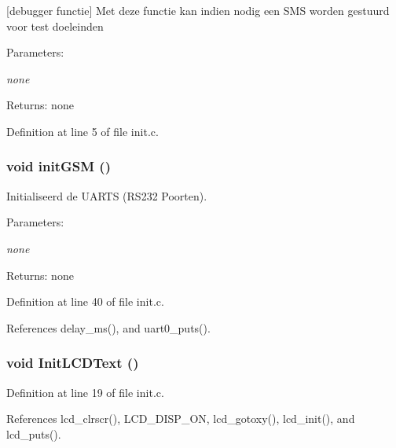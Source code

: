 [debugger functie] Met deze functie kan indien nodig een SMS worden gestuurd voor test doeleinden 

\begin{Desc}
\item[Parameters:]
\begin{description}
\item[{\em none}]\end{description}
\end{Desc}
\begin{Desc}
\item[Returns:]none \end{Desc}


Definition at line 5 of file init.c.
\subsubsection{\setlength{\rightskip}{0pt plus 5cm}void initGSM ()}\label{init_8h_4e89a007463e590994ce3fe3dc12df1d}


Initialiseerd de UARTS (RS232 Poorten). 

\begin{Desc}
\item[Parameters:]
\begin{description}
\item[{\em none}]\end{description}
\end{Desc}
\begin{Desc}
\item[Returns:]none \end{Desc}


Definition at line 40 of file init.c.

References delay\_\-ms(), and uart0\_\-puts().
\subsubsection{\setlength{\rightskip}{0pt plus 5cm}void InitLCDText ()}\label{init_8h_ecc62df77a68ab3ee7b939ff7bb1a881}




Definition at line 19 of file init.c.

References lcd\_\-clrscr(), LCD\_\-DISP\_\-ON, lcd\_\-gotoxy(), lcd\_\-init(), and lcd\_\-puts().
